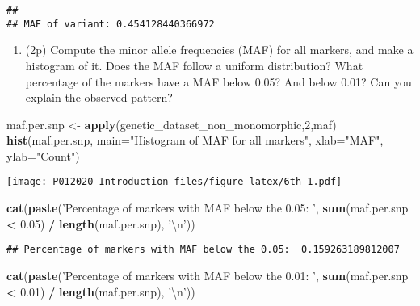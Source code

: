 \documentclass[
]{article}
\newenvironment{Shaded}{\begin{snugshade}}{\end{snugshade}}
\newcommand{\CharTok}[1]{\textcolor[rgb]{0.31,0.60,0.02}{#1}}
\newcommand{\DataTypeTok}[1]{\textcolor[rgb]{0.13,0.29,0.53}{#1}}
\newcommand{\DecValTok}[1]{\textcolor[rgb]{0.00,0.00,0.81}{#1}}
\newcommand{\FloatTok}[1]{\textcolor[rgb]{0.00,0.00,0.81}{#1}}
\newcommand{\KeywordTok}[1]{\textcolor[rgb]{0.13,0.29,0.53}{\textbf{#1}}}
\newcommand{\NormalTok}[1]{#1}
\newcommand{\OperatorTok}[1]{\textcolor[rgb]{0.81,0.36,0.00}{\textbf{#1}}}
\newcommand{\StringTok}[1]{\textcolor[rgb]{0.31,0.60,0.02}{#1}}
\providecommand{\tightlist}{%
  \setlength{\itemsep}{0pt}\setlength{\parskip}{0pt}}
\begin{document}
\begin{verbatim}
## 
## MAF of variant: 0.454128440366972
\end{verbatim}

\begin{enumerate}
\def\labelenumi{\arabic{enumi}.}
\setcounter{enumi}{5}
\tightlist
\item
  (2p) Compute the minor allele frequencies (MAF) for all markers, and
  make a histogram of it. Does the MAF follow a uniform distribution?
  What percentage of the markers have a MAF below 0.05? And below 0.01?
  Can you explain the observed pattern?
\end{enumerate}

\begin{Shaded}
\begin{Highlighting}[]
\NormalTok{maf.per.snp <-}\StringTok{ }\KeywordTok{apply}\NormalTok{(genetic_dataset_non_monomorphic,}\DecValTok{2}\NormalTok{,maf)}
\KeywordTok{hist}\NormalTok{(maf.per.snp, }\DataTypeTok{main=}\StringTok{"Histogram of MAF for all markers"}\NormalTok{, }\DataTypeTok{xlab=}\StringTok{"MAF"}\NormalTok{, }\DataTypeTok{ylab=}\StringTok{"Count"}\NormalTok{)}
\end{Highlighting}
\end{Shaded}

\texttt{[image: P012020\_Introduction\_files/figure-latex/6th-1.pdf]}

\begin{Shaded}
\begin{Highlighting}[]
\KeywordTok{cat}\NormalTok{(}\KeywordTok{paste}\NormalTok{(}\StringTok{'Percentage of markers with MAF below the 0.05: '}\NormalTok{, }\KeywordTok{sum}\NormalTok{(maf.per.snp }\OperatorTok{<}\StringTok{ }\FloatTok{0.05}\NormalTok{) }\OperatorTok{/}\StringTok{ }\KeywordTok{length}\NormalTok{(maf.per.snp), }\StringTok{'}\CharTok{\textbackslash{}n}\StringTok{'}\NormalTok{))}
\end{Highlighting}
\end{Shaded}

\begin{verbatim}
## Percentage of markers with MAF below the 0.05:  0.159263189812007
\end{verbatim}

\begin{Shaded}
\begin{Highlighting}[]
\KeywordTok{cat}\NormalTok{(}\KeywordTok{paste}\NormalTok{(}\StringTok{'Percentage of markers with MAF below the 0.01: '}\NormalTok{, }\KeywordTok{sum}\NormalTok{(maf.per.snp }\OperatorTok{<}\StringTok{ }\FloatTok{0.01}\NormalTok{) }\OperatorTok{/}\StringTok{ }\KeywordTok{length}\NormalTok{(maf.per.snp), }\StringTok{'}\CharTok{\textbackslash{}n}\StringTok{'}\NormalTok{))}
\end{Highlighting}
\end{Shaded}
\end{document}

